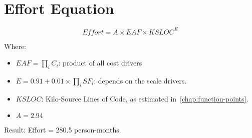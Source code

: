 \section{Effort Equation}

\[
Effort = A \times EAF \times KSLOC^E
\]

Where:
\begin{itemize}
    \item $EAF = \prod_i C_i$: product of all cost drivers
    \item $E=0.91 + 0.01 \times \prod_{i}SF_i$: depends on the scale drivers.
    \item $KSLOC$: Kilo-Source Lines of Code, as estimated in~\ref{chap:function-points}.
    \item $A=2.94$
\end{itemize}

Result: Effort = 280.5 person-months.
